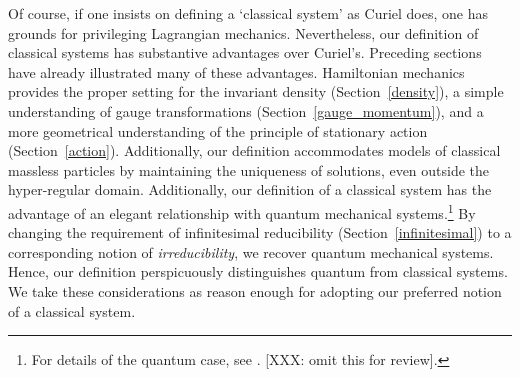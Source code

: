 \documentclass[letterpaper]{article}
\begin{document}


Of course, if one insists on defining a `classical system' as Curiel does, one has grounds for privileging Lagrangian mechanics. Nevertheless, our definition of classical systems has substantive advantages over Curiel's. Preceding sections have already illustrated many of these advantages. Hamiltonian mechanics provides the proper setting for the invariant density (Section~\ref{density}), a simple understanding of gauge transformations (Section~\ref{gauge_momentum}), and a more geometrical understanding of the principle of stationary action (Section~\ref{action}). Additionally, our definition accommodates models of classical massless particles by maintaining the uniqueness of solutions, even outside the hyper-regular domain. Additionally, our definition of a classical system has the advantage of an elegant relationship with quantum mechanical systems.\footnote{For details of the quantum case, see \textcites{AoPPhy1}. [XXX: omit this for review].} By changing the requirement of infinitesimal reducibility (Section~\ref{infinitesimal}) to a corresponding notion of \textit{irreducibility}, we recover quantum mechanical systems. Hence, our definition perspicuously distinguishes quantum from classical systems. We take these considerations as reason enough for adopting our preferred notion of a classical system. 
\end{document}
